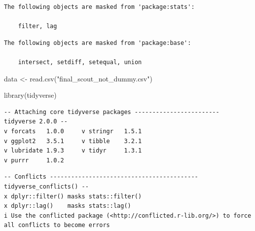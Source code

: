 \documentclass[
  letterpaper,
  DIV=11,
  numbers=noendperiod]{scrartcl}
\newenvironment{Shaded}{\begin{snugshade}}{\end{snugshade}}
\newcommand{\FunctionTok}[1]{\textcolor[rgb]{0.28,0.35,0.67}{#1}}
\newcommand{\NormalTok}[1]{\textcolor[rgb]{0.00,0.23,0.31}{#1}}
\newcommand{\OtherTok}[1]{\textcolor[rgb]{0.00,0.23,0.31}{#1}}
\newcommand{\StringTok}[1]{\textcolor[rgb]{0.13,0.47,0.30}{#1}}
\begin{document}
\begin{verbatim}
The following objects are masked from 'package:stats':

    filter, lag
\end{verbatim}

\begin{verbatim}
The following objects are masked from 'package:base':

    intersect, setdiff, setequal, union
\end{verbatim}

\begin{Shaded}
\begin{Highlighting}[]
\NormalTok{data }\OtherTok{\textless{}{-}} \FunctionTok{read.csv}\NormalTok{(}\StringTok{"final\_scout\_not\_dummy.csv"}\NormalTok{)}

\FunctionTok{library}\NormalTok{(tidyverse)}
\end{Highlighting}
\end{Shaded}

\begin{verbatim}
-- Attaching core tidyverse packages ------------------------ tidyverse 2.0.0 --
v forcats   1.0.0     v stringr   1.5.1
v ggplot2   3.5.1     v tibble    3.2.1
v lubridate 1.9.3     v tidyr     1.3.1
v purrr     1.0.2     
\end{verbatim}

\begin{verbatim}
-- Conflicts ------------------------------------------ tidyverse_conflicts() --
x dplyr::filter() masks stats::filter()
x dplyr::lag()    masks stats::lag()
i Use the conflicted package (<http://conflicted.r-lib.org/>) to force all conflicts to become errors
\end{verbatim}
\end{document}
